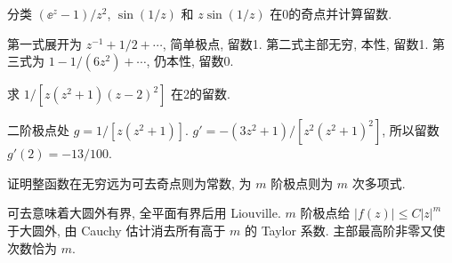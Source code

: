 \begin{exercise}
分类 $(\ee^z-1)/z^2$, $\sin(1/z)$ 和 $z\sin(1/z)$ 在0的奇点并计算留数.
\end{exercise}
\begin{solution}
第一式展开为 $z^{-1}+1/2+\cdots$, 简单极点, 留数1. 第二式主部无穷, 本性, 留数1. 第三式为 $1-1/(6z^2)+\cdots$, 仍本性, 留数0.
\end{solution}
\begin{exercise}
求 $1/[z(z^2+1)(z-2)^2]$ 在2的留数.
\end{exercise}
\begin{solution}
二阶极点处 $g=1/[z(z^2+1)]$. $g'=- (3z^2+1)/[z^2(z^2+1)^2]$, 所以留数 $g'(2)=-13/100$.
\end{solution}
\begin{exercise}
证明整函数在无穷远为可去奇点则为常数, 为 $m$ 阶极点则为 $m$ 次多项式.
\end{exercise}
\begin{solution}
可去意味着大圆外有界, 全平面有界后用 Liouville. $m$ 阶极点给 $|f(z)|\le C|z|^m$ 于大圆外, 由 Cauchy 估计消去所有高于 $m$ 的 Taylor 系数. 主部最高阶非零又使次数恰为 $m$.
\end{solution}
